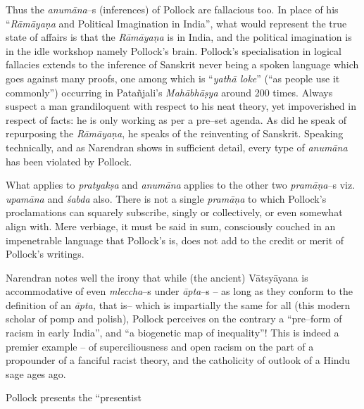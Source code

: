 {Thus the \textit{anumāna}–s (inferences) of Pollock are fallacious too. In place of his “\textit{Rāmāyaṇa} and Political Imagination in India”, what would represent the true state of affairs is that the \textit{Rāmāyaṇa} is in India, and the political imagination is in the idle workshop namely Pollock’s brain. Pollock’s specialisation in logical fallacies extends to the inference of Sanskrit never being a spoken language which goes against many proofs, one among which is “\textit{yathā loke}” (“as people use it commonly”) occurring in Patañjali’s \textit{Mahābhāṣya} around 200 times. Always suspect a man grandiloquent with respect to his neat theory, yet impoverished in respect of facts: he is only working as per a pre–set agenda. As did he speak of repurposing the \textit{Rāmāyaṇa}, he speaks of the reinventing of Sanskrit. Speaking technically, and as Narendran shows in sufficient detail, every type of \textit{anumāna} has been violated by Pollock.

What applies to \textit{pratyakṣa} and \textit{anumāna} applies to the other two \textit{pramāṇa}–s viz. \textit{upamāna} and \textit{śabda} also. There is not a single \textit{pramāṇa} to which Pollock’s proclamations can squarely subscribe, singly or collectively, or even somewhat align with. Mere verbiage, it must be said in sum, consciously couched in an impenetrable language that Pollock’s is, does not add to the credit or merit of Pollock’s writings.

Narendran notes well the irony that while (the ancient) Vātsyāyana is accommodative of even \textit{mleccha}–s under \textit{āpta}–s – as long as they conform to the definition of an \textit{āpta,} that is– which is impartially the same for all (this modern scholar of pomp and polish), Pollock perceives on the contrary a “pre–form of racism in early India”, and “a biogenetic map of inequality”! This is indeed a premier example – of superciliousness and open racism on the part of a propounder of a fanciful racist theory, and the catholicity of outlook of a Hindu sage ages ago.

Pollock presents the “presentist}
